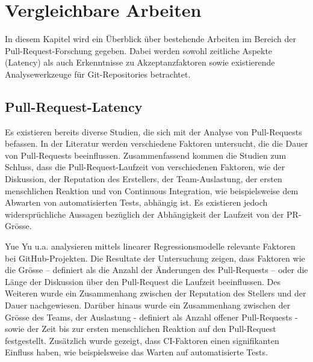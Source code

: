 \section{Vergleichbare Arbeiten}
In diesem Kapitel wird ein Überblick über bestehende Arbeiten im Bereich der Pull-Request-Forschung gegeben. Dabei werden sowohl zeitliche Aspekte (Latency) als auch Erkenntnisse zu Akzeptanzfaktoren sowie existierende Analysewerkzeuge für Git-Repositories betrachtet.

\subsection{Pull-Request-Latency}
\label{sec:PullRequestDauer}
Es existieren bereits diverse Studien, die sich mit der Analyse von Pull-Requests befassen. In der Literatur werden verschiedene Faktoren untersucht, die die Dauer von Pull-Requests beeinflussen. Zusammenfassend kommen die Studien zum Schluss, dass die Pull-Request-Laufzeit von verschiedenen Faktoren, wie der Diskussion, der Reputation des Erstellers, der Team-Auslastung, der ersten menschlichen Reaktion und von Continuous Integration, wie beispielsweise dem Abwarten von automatisierten Tests, abhängig ist. Es existieren jedoch widersprüchliche Aussagen bezüglich der Abhängigkeit der Laufzeit von der PR-Grösse. \parencite{yu_wait_2015}\parencite{hasan_understanding_2023}\parencite{kudrjavets_small_2022}\parencite{bernardo_studying_2018}

Yue Yu u.a.\parencite{yu_wait_2015} analysieren mittels linearer Regressionsmodelle relevante Faktoren bei GitHub-Projekten. Die Resultate der Untersuchung zeigen, dass Faktoren wie die Grösse – definiert als die Anzahl der Änderungen des Pull-Requests – oder die Länge der Diskussion über den Pull-Request die Laufzeit beeinflussen. Des Weiteren wurde ein Zusammenhang zwischen der Reputation des Stellers und der Dauer nachgewiesen. Darüber hinaus wurde ein Zusammenhang zwischen der Grösse des Teams, der Auslastung - definiert als Anzahl offener Pull-Requests - sowie der Zeit bis zur ersten menschlichen Reaktion auf den Pull-Request festgestellt. Zusätzlich wurde gezeigt, dass CI-Faktoren einen signifikanten Einfluss haben, wie beispielsweise das Warten auf automatisierte Tests.~\parencite{yu_wait_2015}


